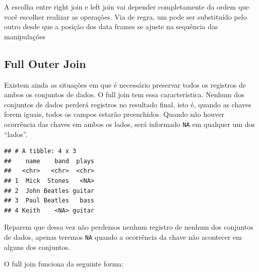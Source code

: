 \documentclass[]{book}
\newenvironment{Shaded}{\begin{snugshade}}{\end{snugshade}}
\newcommand{\KeywordTok}[1]{\textcolor[rgb]{0.13,0.29,0.53}{\textbf{#1}}}
\newcommand{\DataTypeTok}[1]{\textcolor[rgb]{0.13,0.29,0.53}{#1}}
\newcommand{\StringTok}[1]{\textcolor[rgb]{0.31,0.60,0.02}{#1}}
\newcommand{\OperatorTok}[1]{\textcolor[rgb]{0.81,0.36,0.00}{\textbf{#1}}}
\newcommand{\NormalTok}[1]{#1}
\begin{document}
A escolha entre right join e left join vai depender completamente da
ordem que você escolher realizar as operações. Via de regra, um pode ser
substituído pelo outro desde que a posição dos data frames se ajuste na
sequência das manipulações

\subsection{Full Outer Join}\label{full-outer-join}

Existem ainda as situações em que é necessário preservar todos os
registros de ambos os conjuntos de dados. O full join tem essa
característica. Nenhum dos conjuntos de dados perderá registros no
resultado final, isto é, quando as chaves forem iguais, todos os campos
estarão preenchidos. Quando não houver ocorrência das chaves em ambos os
lados, será informado \texttt{NA} em qualquer um dos ``lados''.

\begin{Shaded}
\end{Shaded}

\begin{verbatim}
## # A tibble: 4 x 3
##    name    band  plays
##   <chr>   <chr>  <chr>
## 1  Mick  Stones   <NA>
## 2  John Beatles guitar
## 3  Paul Beatles   bass
## 4 Keith    <NA> guitar
\end{verbatim}

Reparem que dessa vez não perdemos nenhum registro de nenhum dos
conjuntos de dados, apenas teremos \texttt{NA} quando a ocorrência da
chave não acontecer em alguns dos conjuntos.

O full join funciona da seguinte forma:
\end{document}
